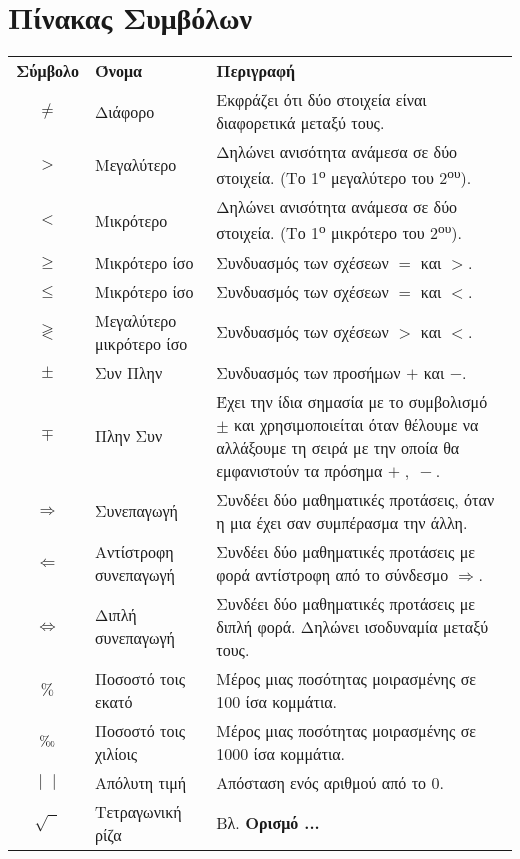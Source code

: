 \documentclass[twoside,11pt,a4paper]{book}
\DeclareRobustCommand{\perthousand}{%
\ifmmode
\text{\textperthousand}%
\else
\textperthousand
\fi}
\begin{document}
\chapter*{Πίνακας Συμβόλων}
{\par\centering

\begin{tabularx}{\textwidth}{c>{\centering}m{3.1cm}|>{\centering\arraybackslash}m{11.75cm}}
\hline\rule[-2ex]{0pt}{5.5ex}\textbf{Σύμβολο} & \textbf{Όνομα} & \textbf{Περιγραφή}\\
\hhline{===}\rule[-2ex]{0pt}{8.5ex}
$ \neq $ & Διάφορο & Εκφράζει ότι δύο στοιχεία είναι διαφορετικά μεταξύ τους.\\
\rule[-2ex]{0pt}{5.5ex}
$ > $ & Μεγαλύτερο & Δηλώνει ανισότητα ανάμεσα σε δύο στοιχεία. (Το 1\textsuperscript{ο} μεγαλύτερο του 2\textsuperscript{ου}).\\
\rule[-2ex]{0pt}{5.5ex}
$ < $ & Μικρότερο & Δηλώνει ανισότητα ανάμεσα σε δύο στοιχεία. (Το 1\textsuperscript{ο} μικρότερο του 2\textsuperscript{ου}).\\
\rule[-2ex]{0pt}{5.5ex}
$ \geq $ & Μικρότερο ίσο & Συνδυασμός των σχέσεων $=$ και $>$.\\
\rule[-2ex]{0pt}{5.5ex}
$ \leq $ & Μικρότερο ίσο & Συνδυασμός των σχέσεων $=$ και $<$.\\
\rule[-2ex]{0pt}{5.5ex}
$ \gtrless $ & Μεγαλύτερο μικρότερο ίσο & Συνδυασμός των σχέσεων $>$ και $<$.\\
\rule[-2ex]{0pt}{5.5ex}
$ \pm $ & Συν Πλην & Συνδυασμός των προσήμων $+$ και $-$.\\
\rule[-2ex]{0pt}{5.5ex}
$ \mp $ & Πλην Συν & Έχει την ίδια σημασία με το συμβολισμό $\pm$  και χρησιμοποιείται όταν θέλουμε να αλλάξουμε τη σειρά με την οποία θα εμφανιστούν τα πρόσημα $+\;,\;-$. \\
\rule[-2ex]{0pt}{7ex}
$ \Rightarrow $ & Συνεπαγωγή & Συνδέει δύο μαθηματικές προτάσεις, όταν η μια έχει σαν συμπέρασμα την άλλη. \\
\rule[-2ex]{0pt}{7ex}
$ \Leftarrow $ & Αντίστροφη συνεπαγωγή & Συνδέει δύο μαθηματικές προτάσεις με φορά αντίστροφη από το σύνδεσμο $ \Rightarrow $. \\
\rule[-2ex]{0pt}{7ex}
$ \Leftrightarrow $ & Διπλή συνεπαγωγή & Συνδέει δύο μαθηματικές προτάσεις με διπλή φορά. Δηλώνει ισοδυναμία μεταξύ τους.  \\
\rule[-2ex]{0pt}{7ex}
$ \% $ & Ποσοστό τοις εκατό & Μέρος μιας ποσότητας μοιρασμένης σε 100 ίσα κομμάτια. \\
\rule[-2ex]{0pt}{7ex}
$ \perthousand $ & Ποσοστό τοις χιλίοις & Μέρος μιας ποσότητας μοιρασμένης σε 1000 ίσα κομμάτια. \\
\rule[-2ex]{0pt}{5.5ex}
$ |\;\;| $ & Απόλυτη τιμή & Απόσταση ενός αριθμού από το 0. \\
\rule[-2ex]{0pt}{5.5ex}
$ \sqrt{\;\;} $ & Τετραγωνική ρίζα & Βλ. \textbf{Ορισμό ...} \\
\hline
\end{tabularx}
\par}
\end{document}
